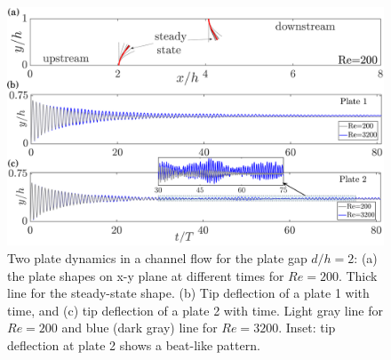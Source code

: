 \documentclass[aps,pre,twocolumn,aps,longbibliography]{revtex4-1}
\begin{document}
	
	
	
	\begin{figure}
		\begin{minipage}[c]{1\linewidth}
			\includegraphics[width=1\linewidth]{Fig05.pdf} 
		\end{minipage} 
		\caption{Two plate dynamics in a channel flow for the plate gap $d/h=2$: (a) the plate shapes on x-y plane at different times for $Re=200$. Thick line for the steady-state shape. (b) Tip deflection of a plate 1 with time, and (c) tip deflection of a plate 2 with time.  Light gray line for $Re=200$ and blue (dark gray) line for $Re=3200$. Inset: tip deflection at plate 2 shows a beat-like pattern.}
		\label{fig:Dfil_dyn_dh2}
	\end{figure}
	
	
	
\end{document}

